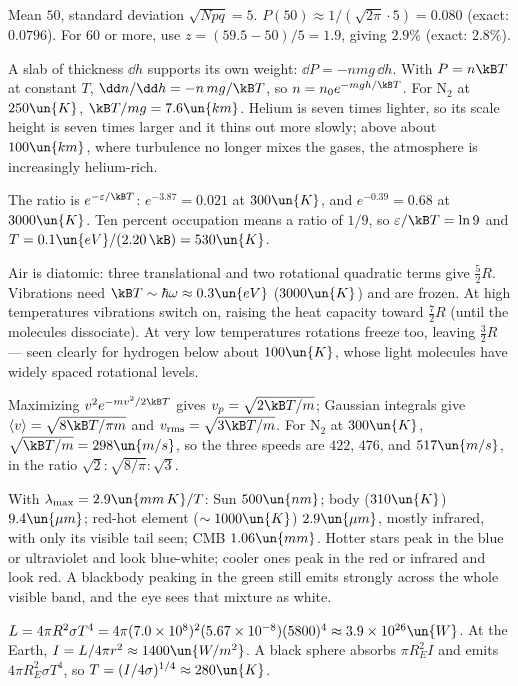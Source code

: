 
 Mean $50$, standard deviation $\sqrt{Npq} = 5$. $P(50)\approx1/(\sqrt{2\pi}\cdot5) = 0.080$ (exact: $0.0796$). For $60$ or more, use $z = (59.5-50)/5 = 1.9$, giving $2.9\%$ (exact: $2.8\%$).

 A slab of thickness $\dd h$ supports its own weight: $\dd P = -nmg\,\dd h$. With $P = n\kB T$ at constant $T$, $\dd n/\dd h = -n\,mg/\kB T$, so $n = n_0e^{-mgh/\kB T}$. For N$_2$ at $250\un{K}$, $\kB T/mg = 7.6\un{km}$. Helium is seven times lighter, so its scale height is seven times larger and it thins out more slowly; above about $100\un{km}$, where turbulence no longer mixes the gases, the atmosphere is increasingly helium-rich.

 The ratio is $e^{-\varepsilon/\kB T}$: $e^{-3.87} = 0.021$ at $300\un{K}$, and $e^{-0.39} = 0.68$ at $3000\un{K}$. Ten percent occupation means a ratio of $1/9$, so $\varepsilon/\kB T = \ln9$ and $T = 0.1\un{eV}/(2.20\,\kB) = 530\un{K}$.

 Air is diatomic: three translational and two rotational quadratic terms give $\tfrac52R$. Vibrations need $\kB T\sim\hbar\omega\approx0.3\un{eV}$ ($3000\un{K}$) and are frozen. At high temperatures vibrations switch on, raising the heat capacity toward $\tfrac72R$ (until the molecules dissociate). At very low temperatures rotations freeze too, leaving $\tfrac32R$ --- seen clearly for hydrogen below about $100\un{K}$, whose light molecules have widely spaced rotational levels.

 Maximizing $v^2e^{-mv^2/2\kB T}$ gives $v_p = \sqrt{2\kB T/m}$; Gaussian integrals give $\langle v\rangle = \sqrt{8\kB T/\pi m}$ and $v_{\text{rms}} = \sqrt{3\kB T/m}$. For N$_2$ at $300\un{K}$, $\sqrt{\kB T/m} = 298\un{m/s}$, so the three speeds are $422$, $476$, and $517\un{m/s}$, in the ratio $\sqrt2:\sqrt{8/\pi}:\sqrt3$.

 With $\lambda_{\max} = 2.9\un{mm\,K}/T$: Sun $500\un{nm}$; body ($310\un{K}$) $9.4\un{\mu m}$; red-hot element ($\sim1000\un{K}$) $2.9\un{\mu m}$, mostly infrared, with only its visible tail seen; CMB $1.06\un{mm}$. Hotter stars peak in the blue or ultraviolet and look blue-white; cooler ones peak in the red or infrared and look red. A blackbody peaking in the green still emits strongly across the whole visible band, and the eye sees that mixture as white.

 $L = 4\pi R^2\sigma T^4 = 4\pi(7.0\times10^8)^2(5.67\times10^{-8})(5800)^4\approx3.9\times10^{26}\un{W}$. At the Earth, $I = L/4\pi r^2\approx1400\un{W/m^2}$. A black sphere absorbs $\pi R_E^2I$ and emits $4\pi R_E^2\sigma T^4$, so $T = (I/4\sigma)^{1/4}\approx280\un{K}$.

